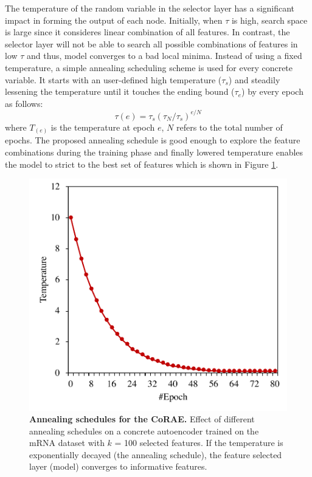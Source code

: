 \documentclass{bioinfo}
\begin{document}
The temperature of the random variable in the selector layer has a significant impact in forming the output of each node. Initially, when $\tau$ is high, search space is large since it consideres linear combination of all features. In contrast, the selector layer will not be able to search all possible combinations of features in low $\tau$ and thus, model converges to a bad local minima. Instead of using a fixed temperature, a simple annealing scheduling scheme is used for every concrete variable. It starts with an user-defined high temperature ($\tau_s$) and steadily lessening the temperature until it touches the ending bound ($\tau_e$) by every epoch as follows: 
\begin{equation}
\tau(e) = \tau_s(\tau_N/\tau_s)^{e/N}
\end{equation}
where $T_{(e)}$ is the temperature at epoch $e$, $N$ refers to the total number of epochs. The proposed annealing schedule is good enough to explore the feature combinations during the training phase and finally lowered temperature enables the model to strict to the best set of features which is shown in Figure \ref{fig:temp}.

\begin{figure}[hbt]
    \centering
    \includegraphics[scale=0.5]{fig/temp-epoch-mRNA.pdf}
    \caption{\textbf{Annealing schedules for the CoRAE.} Effect of different annealing schedules on a
concrete autoencoder trained on the mRNA dataset with $k$ = 100
selected features. If
the temperature is exponentially decayed (the annealing schedule), the feature selected layer (model) converges to informative features.}
    \label{fig:temp}
\end{figure}
\end{document}

